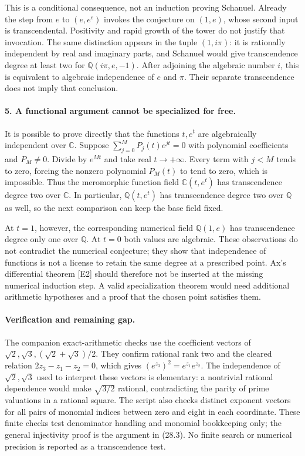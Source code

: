 \documentclass[11pt]{article}
\begin{document}
This is a conditional consequence, not an induction proving Schanuel.
Already the step from $e$ to $(e,e^e)$ invokes the conjecture on $(1,e)$,
whose second input is transcendental. Positivity and rapid growth of the
tower do not justify that invocation. The same distinction appears in the
tuple $(1,i\pi)$: it is rationally independent by real and imaginary parts,
and Schanuel would give transcendence degree at least two for
$\mathbb Q(i\pi,e,-1)$. After adjoining the algebraic number $i$, this is
equivalent to algebraic independence of $e$ and $\pi$. Their separate
transcendence does not imply that conclusion.

\paragraph{5. A functional argument cannot be specialized for free.}
It is possible to prove directly that the functions $t,e^t$ are algebraically
independent over $\mathbb C$. Suppose
$\sum_{j=0}^M P_j(t)e^{jt}=0$ with polynomial coefficients and $P_M\ne0$.
Divide by $e^{Mt}$ and take real $t\to+\infty$. Every term with $j<M$
tends to zero, forcing the nonzero polynomial $P_M(t)$ to tend to zero,
which is impossible. Thus the meromorphic function field
$\mathbb C(t,e^t)$ has transcendence degree two over $\mathbb C$.
In particular, $\mathbb Q(t,e^t)$ has transcendence degree two over
$\mathbb Q$ as well, so the next comparison can keep the base field fixed.

At $t=1$, however, the corresponding numerical field $\mathbb Q(1,e)$ has
transcendence degree only one over $\mathbb Q$. At $t=0$ both values are
algebraic. These observations do not contradict the numerical conjecture;
they show that independence of functions is not a license to retain the
same degree at a prescribed point. Ax's differential theorem [E2] should
therefore not be inserted at the missing numerical induction step. A valid
specialization theorem would need additional arithmetic hypotheses and a
proof that the chosen point satisfies them.

\paragraph{Verification and remaining gap.}
The companion exact-arithmetic checks use the coefficient vectors of
$\sqrt2,\sqrt3,(\sqrt2+\sqrt3)/2$. They confirm rational rank two and the
cleared relation $2z_3-z_1-z_2=0$, which gives
$(e^{z_3})^2=e^{z_1}e^{z_2}$. The independence of $\sqrt2,\sqrt3$ used to
interpret these vectors is elementary: a nontrivial rational dependence
would make $\sqrt{3/2}$ rational, contradicting the parity of prime
valuations in a rational square. The script also checks distinct exponent
vectors for all pairs of monomial indices between zero and eight in each
coordinate. These finite checks test denominator handling and monomial
bookkeeping only; the general injectivity proof is the argument in (28.3).
No finite search or numerical precision is reported as a transcendence test.
\end{document}
